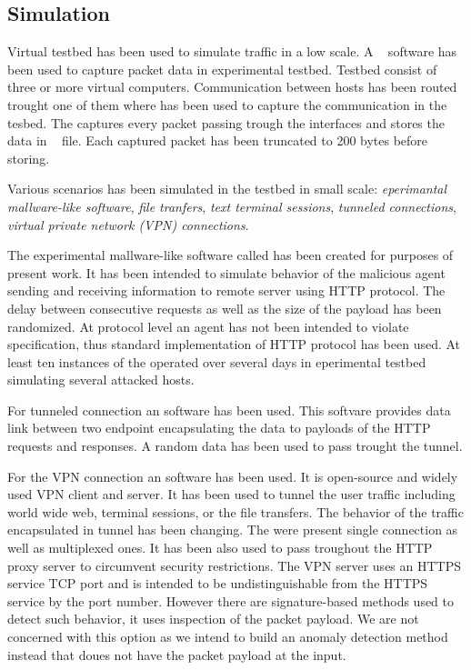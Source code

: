 \subsection{Simulation}
Virtual testbed has been used to simulate traffic in a low scale.
A ~\cite{jacobson2009tcpdump} software has been used to 
capture packet data in experimental testbed.
Testbed consist of three or more virtual computers. Communication between
hosts has been routed trought one of them where  has been used
to capture the communication in the tesbed. The  captures every
packet passing trough the interfaces and stores the data in  ~\cite{jacobson2009libpcap} file.
Each captured packet has been truncated to 200 bytes before storing.

Various scenarios has been simulated in the testbed  in small scale: 
\emph{eperimantal mallware-like
software}, \emph{file tranfers}, \emph{text terminal sessions}, 
\emph{tunneled connections}, \emph{virtual private network (VPN)  connections}.%

The experimental mallware-like software called  
has been created for purposes of present work.
It has been intended to simulate behavior of the malicious agent sending and receiving information to
remote server using HTTP protocol. The delay between consecutive requests 
as well as the size of the payload has been randomized. 
At protocol level an agent has not been intended to violate specification, 
thus standard implementation of HTTP protocol has been used.
At least ten instances of the  operated over several days 
in eperimental testbed simulating several attacked hosts.

For tunneled connection an  software has been used. This softvare provides
data link between two endpoint encapsulating the data to payloads of the HTTP requests and 
responses. A random data has been used to pass trought the tunnel.

For the VPN connection an  software has been used. It is open-source and
widely used VPN client and server. It has been used to tunnel the user traffic
including world wide web, terminal sessions, or the file transfers. The behavior of the
traffic encapsulated in tunnel has been changing. The were present single connection as well
as multiplexed ones. It has been also used to pass troughout the HTTP proxy server 
to circumvent security restrictions. 
The VPN server uses an HTTPS service TCP port and is intended to be undistinguishable 
from the HTTPS service by the port number. 
However there are signature-based methods used to detect such behavior,
it uses inspection of the packet payload. We are not concerned with this option
as we intend to build an anomaly detection method instead that doues not have 
the packet payload at the input.


